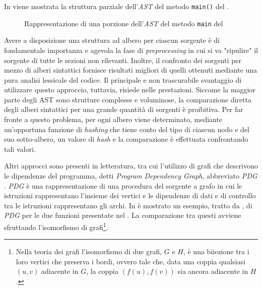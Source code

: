 In  viene mostrata la struttura parziale dell'\textit{AST} del metodo \texttt{main()} del .

\begin{figure}
    \caption{Rappresentazione di una porzione dell'\textit{AST} del metodo \texttt{main} del }
    \label{img:01-ast}
\end{figure}

Avere a disposizione una struttura ad albero per ciascun sorgente è di fondamentale importanza e agevola la fase di \textit{preprocessing} in cui si va "ripulire" il sorgente di tutte le sezioni non rilevanti.
%
Inoltre, il confronto dei sorgenti per mezzo di alberi sintattici fornisce risultati migliori di quelli ottenuti mediante una pura analisi lessicale del codice.
%
Il principale e non trascurabile svantaggio di utilizzare questo approccio, tuttavia, risiede nelle prestazioni.
%
Siccome la maggior parte degli AST sono strutture complesse e voluminose, la comparazione diretta degli alberi sintattici per una grande quantità di sorgenti è proibitiva.
%
Per far fronte a questo problema, per ogni albero viene determinato, mediante un'opportuna funzione di \textit{hashing} che tiene conto del tipo di ciascun nodo e del suo sotto-albero, un valore di \textit{hash} e la comparazione è effettuata confrontando tali valori.

Altri approcci sono presenti in letteratura, tra cui l'utilizzo di grafi che descrivono le dipendenze del programma, detti \textit{Program Dependency Graph}, abbreviato \textit{PDG} \cite{gplag}.
%
\textit{PDG} è una rappresentazione di una procedura del sorgente a grafo in cui le istruzioni rappresentano l'insieme dei vertici e le dipendenze di dati e di controllo tra le istruzioni rappresentano gli archi.
%
In  è mostrato un esempio, tratto da \cite{gplag}, di \textit{PDG} per le due funzioni presentate nel .
%
La comparazione tra questi avviene sfruttando l'isomorfismo di grafi\footnote{Nella teoria dei grafi l'isomorfismo di due grafi, $G$ e $H$, è una biiezione tra i loro vertici che preserva i bordi, ovvero tale che, data una coppia qualsiasi $(u, v)$ adiacente in $G$, la coppia $(f(u), f(v))$ sia ancora adiacente in $H$.}.

